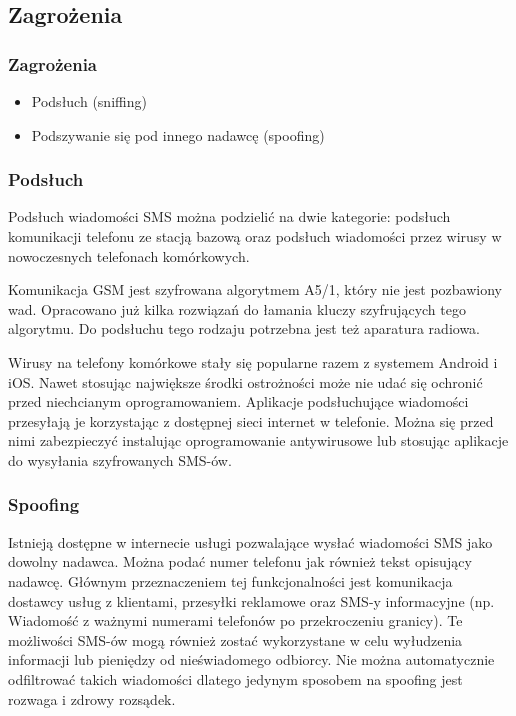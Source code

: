 \documentclass[xcolor=table]{beamer}
\begin{document}
\subsection{Zagrożenia}
\begin{frame}
  \frametitle{Zagrożenia}

\begin{itemize}
  \item Podsłuch (sniffing) 
  \item Podszywanie się pod innego nadawcę (spoofing)
\end{itemize}

\end{frame}

\begin{frame}[allowframebreaks]
  \frametitle{Podsłuch}

  Podsłuch wiadomości SMS można podzielić na dwie kategorie: podsłuch
  komunikacji telefonu ze stacją bazową oraz podsłuch wiadomości przez wirusy w
  nowoczesnych telefonach komórkowych.

  Komunikacja GSM jest szyfrowana algorytmem A5/1, który nie jest pozbawiony
  wad. Opracowano już kilka rozwiązań do łamania kluczy szyfrujących tego
  algorytmu. Do podsłuchu tego rodzaju potrzebna jest też aparatura radiowa.

  \framebreak

  Wirusy na telefony komórkowe stały się popularne razem z systemem Android i
  iOS. Nawet stosując największe środki ostrożności może nie udać się ochronić
  przed niechcianym oprogramowaniem. Aplikacje podsłuchujące wiadomości
  przesyłają je korzystając z dostępnej sieci internet w telefonie. 
  Można się przed nimi zabezpieczyć instalując oprogramowanie
  antywirusowe lub stosując aplikacje do wysyłania szyfrowanych SMS-ów.
\end{frame}

\begin{frame}
  \frametitle{Spoofing}
  
  Istnieją dostępne w internecie usługi pozwalające wysłać wiadomości SMS jako
  dowolny nadawca. Można podać numer telefonu jak również tekst opisujący
  nadawcę. Głównym przeznaczeniem tej funkcjonalności jest komunikacja dostawcy
  usług z klientami, przesyłki reklamowe oraz SMS-y informacyjne (np. Wiadomość
  z ważnymi numerami telefonów po przekroczeniu granicy). Te możliwości SMS-ów
  mogą również zostać wykorzystane w celu wyłudzenia informacji lub pieniędzy
  od nieświadomego odbiorcy. Nie można automatycznie odfiltrować takich
  wiadomości dlatego jedynym sposobem na spoofing jest rozwaga i zdrowy
  rozsądek.

\end{frame}
\end{document}
